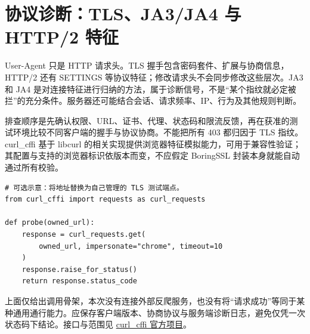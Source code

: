 \section{协议诊断：TLS、JA3/JA4 与 HTTP/2 特征}\label{rev:crawler:tls}
User-Agent 只是 HTTP 请求头。TLS 握手包含密码套件、扩展与协商信息，HTTP/2 还有 SETTINGS 等协议特征；修改请求头不会同步修改这些层次。JA3 和 JA4 是对连接特征进行归纳的方法，属于诊断信号，不是“某个指纹就必定被拦”的充分条件。服务器还可能结合会话、请求频率、IP、行为及其他规则判断。

排查顺序是先确认权限、URL、证书、代理、状态码和限流反馈，再在获准的测试环境比较不同客户端的握手与协议协商。不能把所有 403 都归因于 TLS 指纹。curl\_cffi 基于 libcurl 的相关实现提供浏览器特征模拟能力，可用于兼容性验证；其配置与支持的浏览器标识依版本而变，不应假定 BoringSSL 封装本身就能自动通过所有校验。
\begin{Verbatim}
# 可选示意：将地址替换为自己管理的 TLS 测试端点。
from curl_cffi import requests as curl_requests

def probe(owned_url):
    response = curl_requests.get(
        owned_url, impersonate="chrome", timeout=10
    )
    response.raise_for_status()
    return response.status_code
\end{Verbatim}
上面仅给出调用骨架，本次没有连接外部反爬服务，也没有将“请求成功”等同于某种通用通行能力。应保存客户端版本、协商协议与服务端诊断日志，避免仅凭一次状态码下结论。接口与范围见 \href{https://github.com/lexiforest/curl_cffi}{curl\_cffi 官方项目}。

